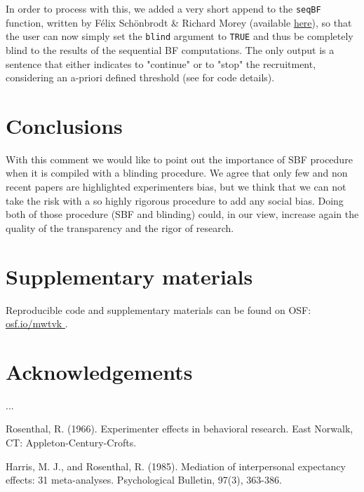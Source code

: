 \documentclass[a4paper,man,natbib,floatsintext,donotrepeattitle]{apa6}
\begin{document}
In order to process with this, we added a very short append to the \texttt{seqBF} function, written by Félix Schönbrodt \& Richard Morey (available \href{https://raw.githubusercontent.com/richarddmorey/BayesFactorExtras/master/BayesFactorExtras/R/seqBF.R}{here}), so that the user can now simply set the \texttt{blind} argument to \texttt{TRUE} and thus be completely blind to the results of the sequential BF computations. The only output is a sentence that either indicates to "continue" or to "stop" the recruitment, considering an a-priori defined threshold (see  for code details).


\section{Conclusions}

With this comment we would like to point out the importance of SBF procedure when it is compiled with a blinding procedure. We agree that only few and non recent papers are highlighted experimenters bias, but we think that we can not take the risk with a so highly rigorous procedure to add any social bias. Doing both of those procedure (SBF and blinding) could, in our view, increase again the quality of the transparency and the rigor of research. 


\section{Supplementary materials}\label{sec:supp}

Reproducible code and supplementary materials can be found on OSF: \url{osf.io/mwtvk
}.

\section{Acknowledgements}

...



Rosenthal, R. (1966). Experimenter effects in behavioral research. East Norwalk, CT: Appleton-Century-Crofts.

Harris, M. J., and Rosenthal, R. (1985). Mediation of interpersonal expectancy
effects: 31 meta-analyses. Psychological Bulletin, 97(3), 363-386.

\end{document}
